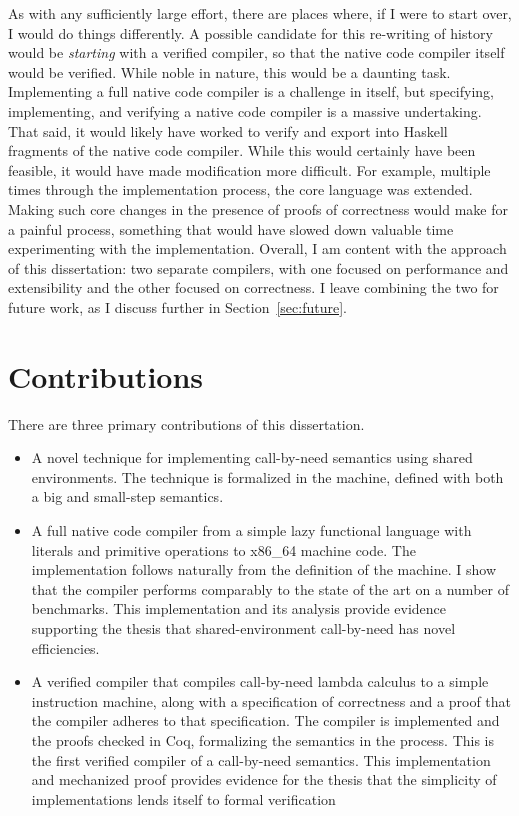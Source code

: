 As with any sufficiently large effort, there are places where, if I were to
start over, I would do things differently. A possible candidate for this
re-writing of history would be \emph{starting} with a verified compiler, so that
the native code compiler itself would be verified. While noble in nature, this
would be a daunting task. Implementing a full native code compiler is a
challenge in itself, but specifying, implementing, and verifying a native code
compiler is a massive undertaking. That said, it would likely have worked to
verify and export into Haskell fragments of the native code compiler. While this
would certainly have been feasible, it would have made modification more
difficult. For example, multiple times through the implementation process, the
core language was extended. Making such core changes in the presence of proofs
of correctness would make for a painful process, something that would have
slowed down valuable time experimenting with the implementation. Overall, I am
content with the approach of this dissertation: two separate compilers, with one
focused on performance and extensibility and the other focused on correctness. I
leave combining the two for future work, as I discuss further in
Section~\ref{sec:future}.

\section{Contributions}

There are three primary contributions of this dissertation.

\begin{itemize}
\item A novel technique for implementing call-by-need semantics using shared
environments. The technique is formalized in the \ce machine, defined with both
a big and small-step semantics.

\item A full native code compiler from a simple lazy functional language with
literals and primitive operations to x86\_64 machine code. The implementation
follows naturally from the definition of the \ce machine. I show that the
compiler performs comparably to the state of the art on a number of benchmarks.
This implementation and its analysis provide evidence supporting the thesis that
shared-environment call-by-need has novel efficiencies.

\item A verified compiler that compiles call-by-need lambda calculus to a simple
instruction machine, along with a specification of correctness and a proof that
the compiler adheres to that specification. The compiler is implemented and the
proofs checked in Coq, formalizing the \ce semantics in the process. This is the
first verified compiler of a call-by-need semantics. This implementation and
mechanized proof provides evidence for the thesis that the simplicity of \ce
implementations lends itself to formal verification
\end{itemize}

